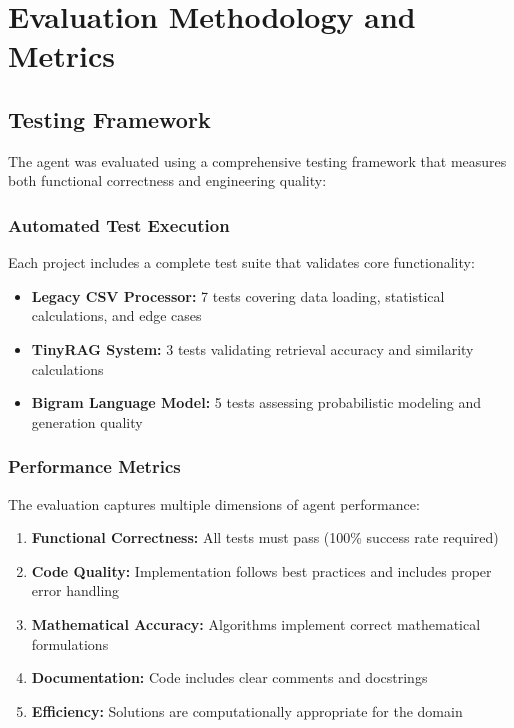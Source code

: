 \documentclass[12pt, a4paper]{article}
\begin{document}
\section{Evaluation Methodology and Metrics}

\subsection{Testing Framework}

The agent was evaluated using a comprehensive testing framework that measures both functional correctness and engineering quality:

\subsubsection{Automated Test Execution}
Each project includes a complete test suite that validates core functionality:

\begin{itemize}
    \item \textbf{Legacy CSV Processor:} 7 tests covering data loading, statistical calculations, and edge cases
    \item \textbf{TinyRAG System:} 3 tests validating retrieval accuracy and similarity calculations
    \item \textbf{Bigram Language Model:} 5 tests assessing probabilistic modeling and generation quality
\end{itemize}

\subsubsection{Performance Metrics}
The evaluation captures multiple dimensions of agent performance:

\begin{enumerate}
    \item \textbf{Functional Correctness:} All tests must pass (100\% success rate required)
    \item \textbf{Code Quality:} Implementation follows best practices and includes proper error handling
    \item \textbf{Mathematical Accuracy:} Algorithms implement correct mathematical formulations
    \item \textbf{Documentation:} Code includes clear comments and docstrings
    \item \textbf{Efficiency:} Solutions are computationally appropriate for the domain
\end{enumerate}
\end{document}
